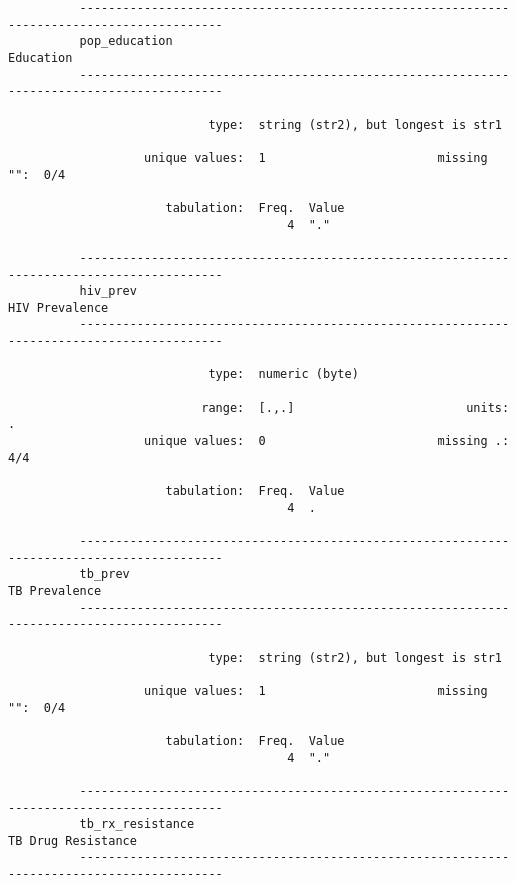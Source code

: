 \documentclass{article}
\begin{document}
\begin{verbatim}
          ------------------------------------------------------------------------------------------
          pop_education                                                                    Education
          ------------------------------------------------------------------------------------------
          
                            type:  string (str2), but longest is str1
          
                   unique values:  1                        missing "":  0/4
          
                      tabulation:  Freq.  Value
                                       4  "."
          
          ------------------------------------------------------------------------------------------
          hiv_prev                                                                    HIV Prevalence
          ------------------------------------------------------------------------------------------
          
                            type:  numeric (byte)
          
                           range:  [.,.]                        units:  .
                   unique values:  0                        missing .:  4/4
          
                      tabulation:  Freq.  Value
                                       4  .
          
          ------------------------------------------------------------------------------------------
          tb_prev                                                                      TB Prevalence
          ------------------------------------------------------------------------------------------
          
                            type:  string (str2), but longest is str1
          
                   unique values:  1                        missing "":  0/4
          
                      tabulation:  Freq.  Value
                                       4  "."
          
          ------------------------------------------------------------------------------------------
          tb_rx_resistance                                                        TB Drug Resistance
          ------------------------------------------------------------------------------------------
          

\end{verbatim}
\end{document}
